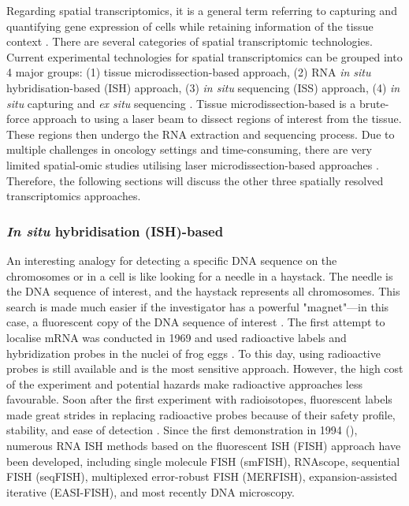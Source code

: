 Regarding spatial transcriptomics, it is a general term referring to capturing and quantifying gene expression of cells while retaining information of the tissue context \cite{burgess2019spatial}. There are several categories of spatial transcriptomic technologies. Current experimental technologies for spatial transcriptomics can be grouped into 4 major groups: (1) tissue microdissection-based approach, (2) RNA \textit{in situ} hybridisation-based (ISH) approach, (3) \textit{in situ} sequencing (ISS) approach, (4) \textit{in situ} capturing and \textit{ex situ} sequencing \cite{williams2022introduction}. Tissue microdissection-based is a brute-force approach to using a laser beam to dissect regions of interest from the tissue. These regions then undergo the RNA extraction and sequencing process. Due to multiple challenges in oncology settings and time-consuming, there are very limited spatial-omic studies utilising laser microdissection-based approaches \cite{wu2022spatial, wu2016spatially, junker2014genome}. Therefore, the following sections will discuss the other three spatially resolved transcriptomics approaches.

\subsubsection{\textit{In situ} hybridisation (ISH)-based}
\label{section:Imaging_sequecing_review}

An interesting analogy for detecting a specific DNA sequence on the chromosomes or in a cell is like looking for a needle in a haystack. The needle is the DNA sequence of interest, and the haystack represents all chromosomes. This search is made much easier if the investigator has a powerful "magnet"—in this case, a fluorescent copy of the DNA sequence of interest \cite{Connor2008natureEdu}. The first attempt to localise mRNA was conducted in 1969 and used radioactive labels and hybridization probes in the nuclei of frog eggs \cite{pardue1969molecular}. To this day, using radioactive probes is still available and is the most sensitive approach. However, the high cost of the experiment and potential hazards make radioactive approaches less favourable. Soon after the first experiment with radioisotopes, fluorescent labels made great strides in replacing radioactive probes because of their safety profile, stability, and ease of detection \cite{rudkin1977high, Connor2008natureEdu}. Since the first demonstration in 1994 (\cite{bassell1994single}), numerous RNA ISH methods based on the fluorescent ISH (FISH) approach have been developed, including single molecule FISH (smFISH), RNAscope, sequential FISH (seqFISH), multiplexed error-robust FISH (MERFISH), expansion-assisted iterative (EASI-FISH), and most recently DNA microscopy. 

